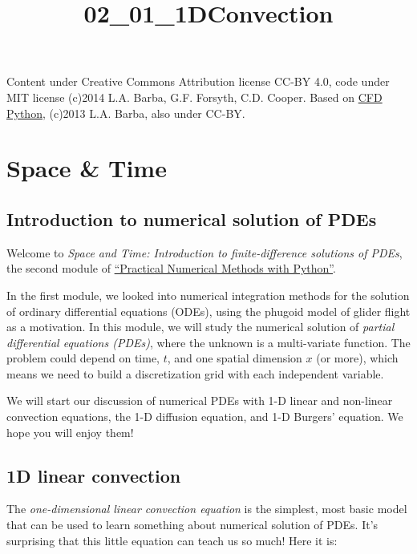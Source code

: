 \documentclass{article}
\title{02\_01\_1DConvection}
\begin{document}
    
    
    \maketitle
    
    

    
    Content under Creative Commons Attribution license CC-BY 4.0, code under
MIT license (c)2014 L.A. Barba, G.F. Forsyth, C.D. Cooper. Based on
\href{https://github.com/barbagroup/CFDPython}{CFD Python}, (c)2013 L.A.
Barba, also under CC-BY.

    \section{Space \& Time}\label{space-time}

    \subsection{Introduction to numerical solution of
PDEs}\label{introduction-to-numerical-solution-of-pdes}

    Welcome to \emph{Space and Time: Introduction to finite-difference
solutions of PDEs}, the second module of
\href{http://openedx.seas.gwu.edu/courses/GW/MAE6286/2014_fall/about}{``Practical
Numerical Methods with Python''}.

In the first module, we looked into numerical integration methods for
the solution of ordinary differential equations (ODEs), using the
phugoid model of glider flight as a motivation. In this module, we will
study the numerical solution of \emph{partial differential equations
(PDEs)}, where the unknown is a multi-variate function. The problem
could depend on time, \(t\), and one spatial dimension \(x\) (or more),
which means we need to build a discretization grid with each independent
variable.

We will start our discussion of numerical PDEs with 1-D linear and
non-linear convection equations, the 1-D diffusion equation, and 1-D
Burgers' equation. We hope you will enjoy them!

    \subsection{1D linear convection}\label{d-linear-convection}

    The \emph{one-dimensional linear convection equation} is the simplest,
most basic model that can be used to learn something about numerical
solution of PDEs. It's surprising that this little equation can teach us
so much! Here it is:
\end{document}
